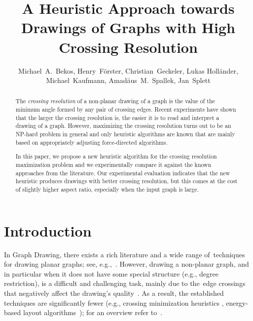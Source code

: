 \documentclass[runningheads]{llncs}
\author{Michael~A.~Bekos, Henry~F\"orster, Christian~Geckeler, Lukas Holl\"ander, Michael~Kaufmann, Amad\"aus~M.~Spallek, Jan~Splett}
\title{A Heuristic Approach towards Drawings of Graphs with High Crossing Resolution}
\institute{
Institut f\"ur Informatik, Universit\"at T\"ubingen, T\"ubingen, Germany\\
\texttt{\{bekos,foersth,geckeler,mk\}@informatik.uni-tuebingen.de}\\
\texttt{\{jan-lukas.hollaender,amadaeus.spallek,jan.splett\} @student.uni-tuebingen.de}
}
\begin{document}
\maketitle

\begin{abstract}
The \emph{crossing resolution} of a non-planar drawing of a graph is the value of the minimum angle formed by any pair of crossing edges. Recent experiments have shown that the larger the crossing resolution is, the easier it is to read and interpret a drawing of a graph. However, maximizing the crossing resolution turns out to be an NP-hard problem in general and only heuristic algorithms are known that are mainly based on appropriately adjusting force-directed algorithms.

In this paper, we propose a new heuristic algorithm for the crossing resolution maximization problem and we experimentally compare it against the known approaches from the literature. Our experimental evaluation indicates that the new heuristic produces drawings with better crossing resolution, but this comes at the cost of slightly higher aspect ratio, especially when the input graph is large.
\end{abstract}

\section{Introduction}
\label{sec:introduction}

In Graph Drawing, there exists a rich literature and a wide range of~techniques for drawing planar graphs; see, e.g.,~\cite{DBLP:journals/combinatorica/FraysseixPP90,DBLP:conf/gd/GutwengerM98,DBLP:journals/algorithmica/Kant96}. However, drawing a non-planar graph, and in particular when it does not have some special structure (e.g., degree restriction), is a difficult and challenging task, mainly due to the~edge crossings that negatively affect the drawing's quality~\cite{DBLP:journals/iwc/Purchase00}. As a result, the established techniques are significantly fewer (e.g., crossing minimization heuristics \cite{DBLP:journals/algorithmica/EadesW94,DBLP:journals/tsmc/SugiyamaTT81}, energy-based layout algorithms~\cite{DBLP:journals/congnum/Eades84,DBLP:journals/spe/FruchtermanR91}); for an overview refer to~\cite{DBLP:books/ph/BattistaETT99,DBLP:conf/dagstuhl/1999dg,DBLP:reference/crc/2013gd}.
\end{document}
